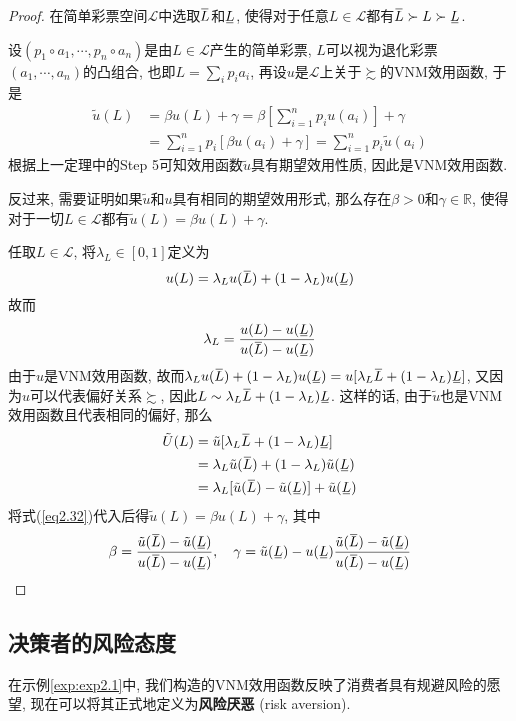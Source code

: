 \documentclass[cn, 12pt, math=mtpro2, bibstyle=apa, blue]{elegantbook}
\newcommand{\R}{\mathbb{R}}
\newcommand{\overbar}[1]{\mkern 1.5mu\overline{\mkern-1.5mu#1\mkern-1.5mu}\mkern 1.5mu}
\newcommand{\ubar}[1]{\mkern 1.5mu\underline{\mkern-1.5mu#1\mkern-1.5mu}\mkern 1.5mu}
\begin{document}
\begin{proof}
  在简单彩票空间$\mathscr{L}$中选取$\overbar{L}$和$\ubar{L}$, 使得对于任意$L\in\mathscr{L}$都有$\overbar{L}\succ L\succ \ubar{L}$. 
  
  设$(p_1\circ a_1,\cdots,p_n\circ a_n)$是由$L\in\mathscr{L}$产生的简单彩票, $L$可以视为退化彩票$(a_1,\cdots,a_n)$的凸组合, 也即$L=\sum_i p_ia_i$, 再设$u$是$\mathscr{L}$上关于$\succsim$的VNM效用函数, 于是
  \begin{align*}
  \tilde{u}(L)&=\beta u(L)+\gamma=\beta\left[\sum_{i=1}^{n}p_iu(a_i)\right]+\gamma \\
  &=\sum_{i=1}^{n}p_i[\beta u(a_i)+\gamma]=\sum_{i=1}^{n}p_i\tilde{u}(a_i)
  \end{align*}
  根据上一定理中的Step 5可知效用函数$\tilde{u}$具有期望效用性质, 因此是VNM效用函数.
  
  反过来, 需要证明如果$\tilde{u}$和$u$具有相同的期望效用形式, 那么存在$\beta>0$和$\gamma\in\R$, 使得对于一切$L\in\mathscr{L}$都有$\tilde{u}(L)=\beta u(L)+\gamma$.
  
  任取$L\in\mathscr{L}$, 将$\lambda_L\in[0,1]$定义为
  $$u(L)=\lambda_Lu(\overbar{L})+(1-\lambda_L)u(\ubar{L})$$
  故而
  \begin{equation}\label{eq2.32}
    \lambda_L=\frac{u(L)-u(\ubar{L})}{u(\overbar{L})-u(\ubar{L})}
  \end{equation}
  由于$u$是VNM效用函数, 故而$\lambda_Lu(\overbar{L})+(1-\lambda_L)u(\ubar{L})=u[\lambda_L\overbar{L}+(1-\lambda_L)\ubar{L}]$, 又因为$u$可以代表偏好关系$\succsim$, 因此$L\sim \lambda_L\overbar{L}+(1-\lambda_L)\ubar{L}$. 这样的话, 由于$\tilde{u}$也是VNM效用函数且代表相同的偏好, 那么
  \begin{align*}
  \tilde{U}(L)&=\tilde{u}[\lambda_L\overbar{L}+(1-\lambda_L)\ubar{L}] \\
  &=\lambda_L\tilde{u}(\overbar{L})+(1-\lambda_L)\tilde{u}(\ubar{L}) \\
  &=\lambda_L[\tilde{u}(\overbar{L})-\tilde{u}(\ubar{L})]+\tilde{u}(\ubar{L})
  \end{align*}
  将式(\ref{eq2.32})代入后得$\tilde{u}(L)=\beta u(L)+\gamma$, 其中
  $$\beta=\frac{\tilde{u}(\overbar{L})-\tilde{u}(\ubar{L})}{u(\overbar{L})-u(\ubar{L})},\quad \gamma=\tilde{u}(\ubar{L})-u(\ubar{L})\frac{\tilde{u}(\overbar{L})-\tilde{u}(\ubar{L})}{u(\overbar{L})-u(\ubar{L})}$$

\end{proof}

\subsection{决策者的风险态度}
在示例\ref{exp:exp2.1}中, 我们构造的VNM效用函数反映了消费者具有规避风险的愿望, 现在可以将其正式地定义为\textbf{风险厌恶} (risk aversion).
\end{document}
